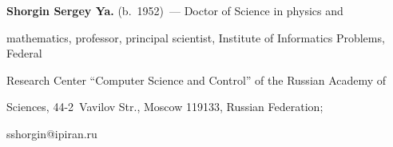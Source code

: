   


  \vspace*{3pt}


  


  \noindent


  \textbf{Shorgin Sergey Ya.} (b.\ 1952)~--- Doctor of Science in physics and 


mathematics, professor, principal scientist, Institute of Informatics Problems, Federal 


Research Center ``Computer Science and Control'' of the Russian Academy of 


Sciences, 44-2~Vavilov Str., Moscow 119133, Russian Federation; 


\mbox{sshorgin@ipiran.ru}


  





\label{end\stat}





\renewcommand{\bibname}{\protect\rm Литература}    


